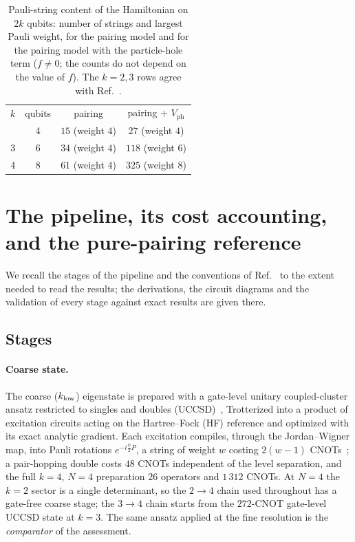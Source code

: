 \documentclass[
  aps,            %
  prc,            %
  reprint,        %
  superscriptaddress,
  floatfix,
  nofootinbib
]{revtex4-2}
\newcommand{\Vph}{V_{\mathrm{ph}}}
\begin{document}
\begin{table}[t]
\caption{\label{tab:pauli}Pauli-string content of the Hamiltonian on $2k$
qubits: number of strings and largest Pauli weight, for the pairing model and
for the pairing model with the particle-hole term ($f\neq0$; the counts do not
depend on the value of $f$).  The $k=2,3$ rows agree with Ref.~\cite{MHJbook}.}
\footnotesize
\begin{ruledtabular}
\begin{tabular}{cccc}
$k$ & qubits & pairing & pairing $+$ $\Vph$\\
\colrule
2 & 4 & $15$ (weight $4$) & $27$ (weight $4$)\\
3 & 6 & $34$ (weight $4$) & $118$ (weight $6$)\\
4 & 8 & $61$ (weight $4$) & $325$ (weight $8$)\\
\end{tabular}
\end{ruledtabular}
\end{table}

\section{The pipeline, its cost accounting, and the pure-pairing reference}
\label{sec:pipeline}
We recall the stages of the pipeline and the conventions of
Ref.~\cite{PairingCompanion} to the extent needed to read the results; the
derivations, the circuit diagrams and the validation of every stage against
exact results are given there.

\subsection{Stages}
\label{sec:stages}
\paragraph{Coarse state.}
The coarse ($k_{\rm low}$) eigenstate is prepared with a gate-level unitary
coupled-cluster ansatz restricted to singles and doubles
(UCCSD)~\cite{LeeUCC2019,Tilly2022}, Trotterized into a product of
excitation circuits acting on the Hartree--Fock (HF) reference and optimized
with its exact analytic gradient.  Each excitation compiles, through the
Jordan--Wigner map, into Pauli rotations $e^{-i\frac\phi2 P}$, a string of
weight $w$ costing $2(w-1)$ CNOTs~\cite{NielsenChuang}; a pair-hopping
double costs $48$ CNOTs independent of the level separation, and the full
$k=4$, $N=4$ preparation $26$ operators and $1\,312$ CNOTs.  At $N=4$ the
$k=2$ sector is a single determinant, so the $2\to4$ chain used throughout
has a gate-free coarse stage; the $3\to4$ chain starts from the $272$-CNOT
gate-level UCCSD state at $k=3$.  The same ansatz applied at the fine
resolution is the \emph{comparator} of the assessment.
\end{document}
